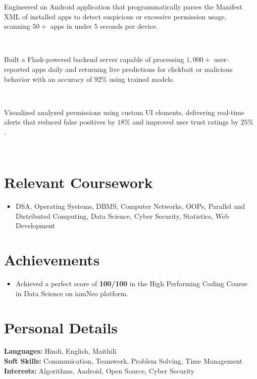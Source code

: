 \documentclass[a4paper,10pt]{article}
\begin{document}
\noindent\makebox[1.5em][l]{--}%
\parbox[t]{\dimexpr\linewidth-1.5em\relax}{%
Engineered an Android application that programmatically parses the Manifest XML of installed apps to detect suspicious or excessive permission usage, scanning $50+$ apps in under $5$ seconds per device.} \\[0pt]

\noindent\makebox[1.5em][l]{--}%
\parbox[t]{\dimexpr\linewidth-1.5em\relax}{%
Built a Flask-powered backend server capable of processing $1{,}000+$ user-reported apps daily and returning live predictions for clickbait or malicious behavior with an accuracy of $92\%$ using trained models.} \\[0pt]

\noindent\makebox[1.5em][l]{--}%
\parbox[t]{\dimexpr\linewidth-1.5em\relax}{%
Visualized analyzed permissions using custom UI elements, delivering real-time alerts that reduced false positives by $18\%$ and improved user trust ratings by $25\%$.} \\[-4pt]




\section{Relevant Coursework}
  \begin{itemize}
    \item DSA, Operating Systems, DBMS, Computer Networks, OOPs, Parallel and Distributed Computing, Data Science, Cyber Security, Statistics, Web Development
  \end{itemize}

\section{Achievements}
  \begin{itemize}
    \item Achieved a perfect score of \textbf{100/100} in the High Performing Coding Course in Data Science on iamNeo platform.
  \end{itemize}


\section{Personal Details}
\vspace{-4pt}
\hspace{1.5em}
\begin{flushleft}
  \textbf{Languages:} Hindi, English, Maithili \\[6pt]
  \textbf{Soft Skills:} Communication, Teamwork, Problem Solving, Time Management \\[6pt]
  \textbf{Interests:} Algorithms, Android, Open Source, Cyber Security
\end{flushleft}
\end{document}
